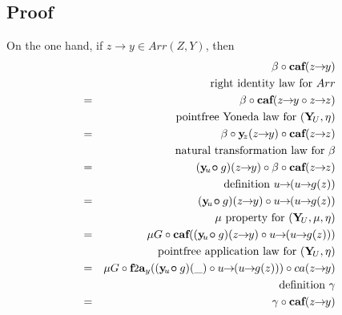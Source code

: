\documentclass[journal]{journal}
\newcommand{\bcirc}{\bm{\circ}}
\newcommand{\prf}{\subsection{Proof}\begingroup\rm}
\newcommand{\arrow}[2]{#1\!\!\rightarrow\!\!#2}
\newcommand{\cfta}[1]{\mbox{{\normalsize {\bf f}}{\small 2}{\normalsize {\bf a}}}_{#1}}
\newcommand{\Y}{\mbox{\bf Y}}
\newcommand{\y}{\mbox{\bf y}}
\newcommand{\caf}{\mbox{\bf caf}}
\begin{document}
\prf
On the one hand, if $\arrow{z}{y} \in Arr(Z,Y)$, then
\setcounter{equation}{0}
\begin{eqnarray*}
&   & \!\!\!\!\!\!\!\!\!\!\!\!\!\!\!\! \beta \circ \caf(\arrow{z}{y}) \\      
&   & \mbox{right identity law for } Arr \\      
& = & \beta \circ \caf(\arrow{z}{y} \circ \arrow{z}{z}) \\   
&   & \mbox{pointfree Yoneda law for } (\Y\!_U, \eta) \\      
& = & \beta \circ \y\!_{z}(\arrow{z}{y}) \circ \caf(\arrow{z}{z}) \\      
&   & \mbox{natural transformation law for } \beta \\      
& = & (\y\!_{u} \!\bcirc g)(\arrow{z}{y}) \circ \beta \circ \caf(\arrow{z}{z}) \\      
&   & \mbox{definition } \arrow{u}{(\arrow{u}{g(z)})} \\
& = & (\y\!_{u} \!\bcirc g)(\arrow{z}{y}) \circ \arrow{u}{(\arrow{u}{g(z)})} \\      
&   & \mu \mbox{ property for } (\Y\!_U, \mu, \eta) \\      
& = & \mu G \circ \caf((\y\!_{u} \!\bcirc g)(\arrow{z}{y}) \circ \arrow{u}{(\arrow{u}{g(z)})}) \\      
&   & \mbox{pointfree application law for } (\Y\!_U, \eta) \\      
& = & \mu G \circ \cfta{y}((\y\!_{u} \!\bcirc g)(\_) \circ \arrow{u}{(\arrow{u}{g(z)})}) \circ ca(\arrow{z}{y}) \\      
&   & \mbox{definition } \gamma \\
& = & \gamma \circ \caf(\arrow{z}{y}) 
\end{eqnarray*}
\vspace{6pt}
\setcounter{equation}{0}
\end{document}

